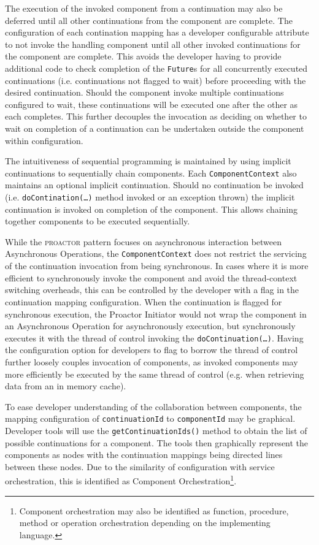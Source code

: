 \documentclass[prodmode]{style/acmlarge}
\begin{document}
The execution of the invoked component from a continuation may also be deferred
until all other continuations from the component are complete.  The
configuration of each contination mapping has a developer configurable attribute
to not invoke the handling component until all other invoked continuations for
the component are complete.  This avoids the developer having to provide
additional code to check completion of the \texttt{Future}s for all concurrently
executed continuations (i.e. continuations not flagged to wait) before
proceeding with the desired continuation.  Should the component invoke multiple
continuations configured to wait, these continuations will be executed one after
the other as each completes.  This further decouples the invocation as deciding
on whether to wait on completion of a continuation can be undertaken outside the
component within configuration.

The intuitiveness of sequential programming is maintained by using implicit
continuations \cite{continuations} to sequentially chain components.  Each
\texttt{ComponentContext} also maintains an optional implicit continuation. 
Should no continuation be invoked (i.e. \texttt{doContination(\ldots)} method
invoked or an exception thrown) the implicit continuation is invoked on
completion of the component.  This allows chaining together components to be
executed sequentially.

While the \textsc{proactor} pattern focuses on asynchronous interaction between
Asynchronous Operations, the \texttt{ComponentContext} does not restrict the
servicing of the continuation invocation from being synchronous.  In cases where
it is more efficient to synchronously invoke the component and avoid the
thread-context switching overheads, this can be controlled by the developer with
a flag in the continuation mapping configuration.  When the continuation is
flagged for synchronous execution, the Proactor Initiator would not wrap the
component in an Asynchronous Operation for asynchronously execution, but
synchronously executes it with the thread of control invoking the
\texttt{doContinuation(\ldots)}.  Having the configuration option for developers
to flag to borrow the thread of control further loosely couples invocation of
components, as invoked components may more efficiently be executed by the same
thread of control (e.g. when retrieving data from an in memory cache).

To ease developer understanding of the collaboration between components, the
mapping configuration of \texttt{continuationId}  to \texttt{componentId} may be
graphical.  Developer tools will use the \texttt{getContinuationIds()} method to
obtain the list of possible continuations for a component.  The tools then
graphically represent the components as nodes with the continuation mappings
being directed lines between these nodes.  Due to the similarity of
configuration with service orchestration, this is identified as Component
Orchestration\footnote{Component orchestration may also be identified as
function, procedure, method or operation orchestration depending on the
implementing language.}.
\end{document}
